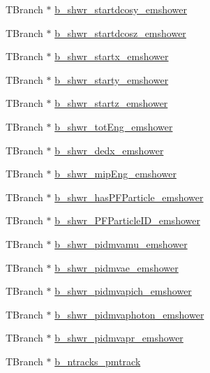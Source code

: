 \begin{DoxyCompactItemize}
T\-Branch $\ast$ \hyperlink{classanatree_ab78dad7cb33a332bf20454f996f5b313}{b\-\_\-shwr\-\_\-startdcosy\-\_\-emshower}
\item 
T\-Branch $\ast$ \hyperlink{classanatree_a737d92ea209d6781ad2e19c0226fb812}{b\-\_\-shwr\-\_\-startdcosz\-\_\-emshower}
\item 
T\-Branch $\ast$ \hyperlink{classanatree_a6a4a697380f1cf7e86523b1a95fffdb9}{b\-\_\-shwr\-\_\-startx\-\_\-emshower}
\item 
T\-Branch $\ast$ \hyperlink{classanatree_a355fe52b10b8524f8a73a5911e3b2b1d}{b\-\_\-shwr\-\_\-starty\-\_\-emshower}
\item 
T\-Branch $\ast$ \hyperlink{classanatree_a9fbab35e3e5a399899623a72a1f46d60}{b\-\_\-shwr\-\_\-startz\-\_\-emshower}
\item 
T\-Branch $\ast$ \hyperlink{classanatree_a6b521c29eb6389af9ad60e74a7d22fd4}{b\-\_\-shwr\-\_\-tot\-Eng\-\_\-emshower}
\item 
T\-Branch $\ast$ \hyperlink{classanatree_a9b2ea44152c0c699e9b4132bfcd6f902}{b\-\_\-shwr\-\_\-dedx\-\_\-emshower}
\item 
T\-Branch $\ast$ \hyperlink{classanatree_a585bc84a73ab3d2aa971eb6ba987cd36}{b\-\_\-shwr\-\_\-mip\-Eng\-\_\-emshower}
\item 
T\-Branch $\ast$ \hyperlink{classanatree_a8f344f49b8aa1d29c0b8e546ccccb9df}{b\-\_\-shwr\-\_\-has\-P\-F\-Particle\-\_\-emshower}
\item 
T\-Branch $\ast$ \hyperlink{classanatree_a122fe315b2ea167d500d25ee92317d8a}{b\-\_\-shwr\-\_\-\-P\-F\-Particle\-I\-D\-\_\-emshower}
\item 
T\-Branch $\ast$ \hyperlink{classanatree_afd1eacf09d50860c598a41db1dc809ac}{b\-\_\-shwr\-\_\-pidmvamu\-\_\-emshower}
\item 
T\-Branch $\ast$ \hyperlink{classanatree_a33729e5a8055bd33e5c40fb5cd312891}{b\-\_\-shwr\-\_\-pidmvae\-\_\-emshower}
\item 
T\-Branch $\ast$ \hyperlink{classanatree_a68907c0bbc14bd07e613a36f052ed895}{b\-\_\-shwr\-\_\-pidmvapich\-\_\-emshower}
\item 
T\-Branch $\ast$ \hyperlink{classanatree_acddee7dc77af04ebd4f7340a6c623cd8}{b\-\_\-shwr\-\_\-pidmvaphoton\-\_\-emshower}
\item 
T\-Branch $\ast$ \hyperlink{classanatree_a1c312b7528dd965e60e966958df44a75}{b\-\_\-shwr\-\_\-pidmvapr\-\_\-emshower}
\item 
T\-Branch $\ast$ \hyperlink{classanatree_ac4bc45c259ca755ad90c0a5ea5c99ef2}{b\-\_\-ntracks\-\_\-pmtrack}
\item 

\end{DoxyCompactItemize}

